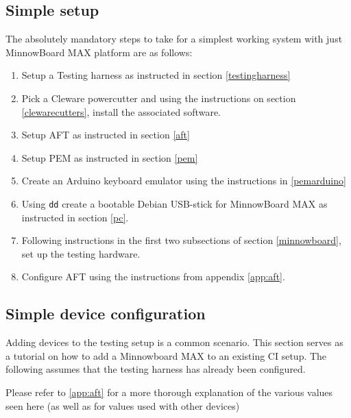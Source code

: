 \documentclass[a4paper,11pt]{article}
\newcommand{\cmd}[1]{\texttt{#1}}
\begin{document}
\subsection{Simple setup}
The absolutely mandatory steps to take for a simplest working system with just MinnowBoard MAX platform are as follows:
\begin{enumerate}
	\item Setup a Testing harness as instructed in section \ref{testingharness}
	\item Pick a Cleware powercutter and using the instructions on section \ref{clewarecutters}, install the associated software.
	\item Setup AFT as instructed in section \ref{aft}
	\item Setup PEM as instructed in section \ref{pem}
	\item Create an Arduino keyboard emulator using the instructions in \ref{pemarduino}
	\item Using \cmd{dd} create a bootable Debian USB-stick for MinnowBoard MAX as instructed in section \ref{pc}.
	\item Following instructions in the first two subsections of section \ref{minnowboard}, set up the testing hardware.
	\item Configure AFT using the instructions from appendix \ref{app:aft}.
\end{enumerate}

\subsection{Simple device configuration}

Adding devices to the testing setup is a common scenario. This section serves as a tutorial on how to add a Minnowboard MAX to an existing CI setup. The following assumes that the testing harness has already been configured.

Please refer to \ref{app:aft} for a more thorough explanation of the various values seen here (as well as for values used with other devices)
\end{document}
